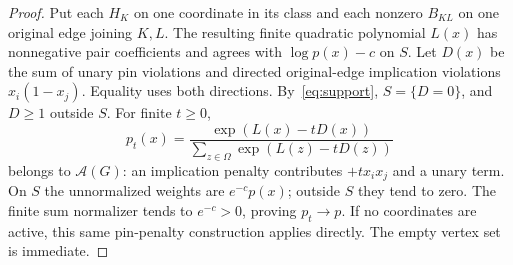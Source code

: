 \documentclass[11pt]{article}
\newcommand{\A}{\mathcal A(G)}
\begin{document}
\begin{proof}
Put each $H_K$ on one coordinate in its class and each nonzero $B_{KL}$ on one original edge joining $K,L$. The resulting finite quadratic polynomial $L(x)$ has nonnegative pair coefficients and agrees with $\log p(x)-c$ on $S$. Let $D(x)$ be the sum of unary pin violations and directed original-edge implication violations $x_i(1-x_j)$. Equality uses both directions. By~\eqref{eq:support}, $S=\{D=0\}$, and $D\geq1$ outside $S$. For finite $t\geq0$,
\[
 p_t(x)=\frac{\exp(L(x)-tD(x))}{\sum_{z\in\Omega}\exp(L(z)-tD(z))}
\]
belongs to $\A$: an implication penalty contributes $+t x_ix_j$ and a unary term. On $S$ the unnormalized weights are $e^{-c}p(x)$; outside $S$ they tend to zero. The finite sum normalizer tends to $e^{-c}>0$, proving $p_t\to p$. If no coordinates are active, this same pin-penalty construction applies directly. The empty vertex set is immediate.
\end{proof}
\end{document}
